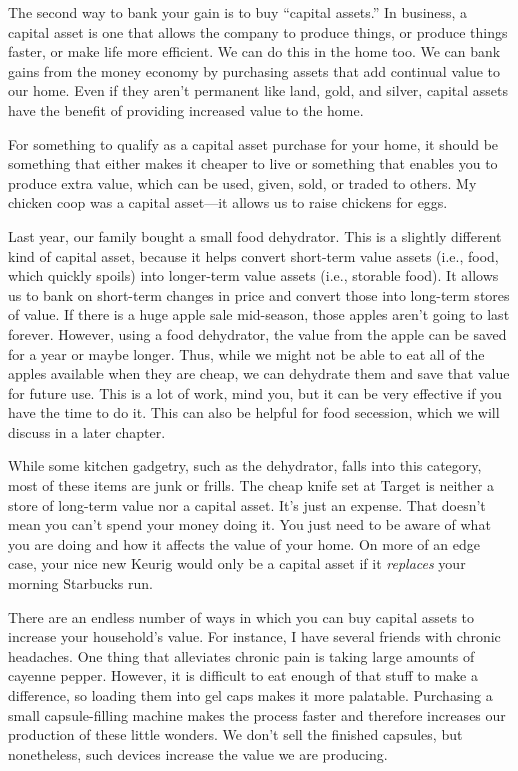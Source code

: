 The second way to bank your gain is to buy ``capital assets.''  In
business, a capital asset is one that allows the company to produce
things, or produce things faster, or make life more efficient. We can
do this in the home too. We can bank gains from the money economy by
purchasing assets that add continual value to our home. Even if they
aren’t permanent like land, gold, and silver, capital assets have the
benefit of providing increased value to the home. 

For something to qualify as a capital asset purchase for your home, it
should be something that either makes it cheaper to live or something
that enables you to produce extra value, which can be used, given,
sold, or traded to others. My chicken coop was a capital asset---it
allows us to raise chickens for eggs. 

Last year, our family bought a small food dehydrator. This is a slightly
different kind of capital asset, because it helps convert short-term
value assets (i.e., food, which quickly spoils) into longer-term value assets (i.e., storable
food). It allows us to bank on short-term changes in price and convert
those into long-term stores of value. If there is a huge apple sale
mid-season, those apples aren’t going to last forever. However, using a
food dehydrator, the value from the apple can be saved for a year or
maybe longer. Thus, while we might not be able to eat all of the apples
available when they are cheap, we can dehydrate them and save that
value for future use. This is a lot of work, mind you, but it can be
very effective if you have the time to do it. This can also be helpful
for food secession, which we will discuss in a later chapter.

While some kitchen gadgetry, such as the
dehydrator, falls into this category, most of these items are junk or
frills. The cheap knife set at Target is neither a store of long-term
value nor a capital asset. It’s just an expense. That doesn’t mean you
can’t spend your money doing it. You just need to be aware of what you
are doing and how it affects the value of your home. On more of an edge
case, your nice new Keurig would only be a capital asset if it
\textit{replaces} your morning Starbucks run.

There are an endless
number of ways in which you can buy capital assets to increase your
household’s value. For instance, I have several friends with chronic
headaches. One thing that alleviates chronic pain is taking large
amounts of cayenne pepper.  However, it is difficult to eat enough
of that stuff to make a difference, so loading them into gel caps makes
it more palatable. Purchasing a small capsule-filling machine makes
the process faster and therefore increases our production of these
little wonders. We don’t sell the finished capsules, but nonetheless, such devices
increase the value we are producing.

